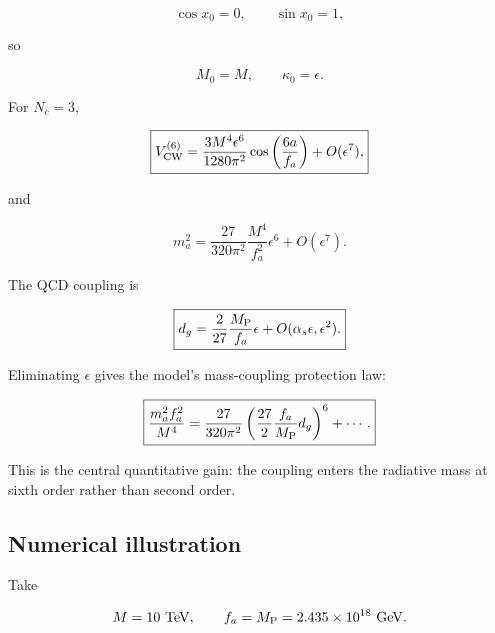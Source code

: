 \documentclass[11pt,a4paper]{article}
\begin{document}
\[
\cos x_0=0,
\qquad
\sin x_0=1,
\]

so

\[
M_0=M,
\qquad
\boxed{\kappa_0=\epsilon.}
\]

For \(N_c=3\),

\[
\boxed{
V_{\rm CW}^{(6)}
=
\frac{3M^4\epsilon^6}{1280\pi^2}
\cos\left(\frac{6a}{f_a}\right)
+O(\epsilon^7),
}
\]

and

\[
\boxed{
 m_a^2
 =
 \frac{27}{320\pi^2}
 \frac{M^4}{f_a^2}\epsilon^6
 +O(\epsilon^7).
}
\]

The QCD coupling is

\[
\boxed{
 d_g
 =
 \frac{2}{27}\frac{M_{\rm P}}{f_a}\epsilon
 +O(\alpha_s\epsilon,\epsilon^2).
}
\]

Eliminating \(\epsilon\) gives the model's mass-coupling protection law:

\[
\boxed{
\frac{m_a^2f_a^2}{M^4}
=
\frac{27}{320\pi^2}
\left(
\frac{27}{2}\frac{f_a}{M_{\rm P}}d_g
\right)^6
+\cdots.
}
\]

This is the central quantitative gain: the coupling enters the radiative
mass at sixth order rather than second order.

\subsection{Numerical illustration}\label{numerical-illustration}

Take

\[
M=10\ \mathrm{TeV},
\qquad
f_a=M_{\rm P}=2.435\times10^{18}\ \mathrm{GeV}.
\]
\end{document}
